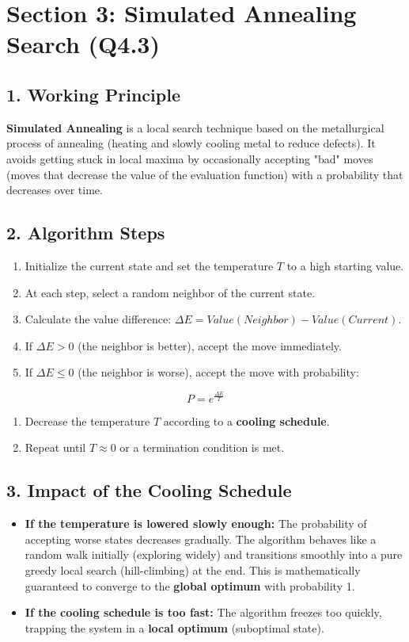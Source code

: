 \section{Section 3: Simulated Annealing Search (Q4.3)}

\subsection{1. Working Principle}
\textbf{Simulated Annealing} is a local search technique based on the metallurgical process of annealing (heating and slowly cooling metal to reduce defects). It avoids getting stuck in local maxima by occasionally accepting "bad" moves (moves that decrease the value of the evaluation function) with a probability that decreases over time.

\subsection{2. Algorithm Steps}
\begin{enumerate}
  \item Initialize the current state and set the temperature $T$ to a high starting value.
  \item At each step, select a random neighbor of the current state.
  \item Calculate the value difference: $\Delta E = Value(Neighbor) - Value(Current)$.
  \item If $\Delta E > 0$ (the neighbor is better), accept the move immediately.
  \item If $\Delta E \le 0$ (the neighbor is worse), accept the move with probability:
\end{enumerate}
    \[ P = e^{\frac{\Delta E}{T}} \]
\begin{enumerate}
  \item Decrease the temperature $T$ according to a \textbf{cooling schedule}.
  \item Repeat until $T \approx 0$ or a termination condition is met.
\end{enumerate}

\subsection{3. Impact of the Cooling Schedule}
\begin{itemize}
  \item   \textbf{If the temperature is lowered slowly enough:} The probability of accepting worse states decreases gradually. The algorithm behaves like a random walk initially (exploring widely) and transitions smoothly into a pure greedy local search (hill-climbing) at the end. This is mathematically guaranteed to converge to the \textbf{global optimum} with probability 1.
  \item   \textbf{If the cooling schedule is too fast:} The algorithm freezes too quickly, trapping the system in a \textbf{local optimum} (suboptimal state).
\end{itemize}


